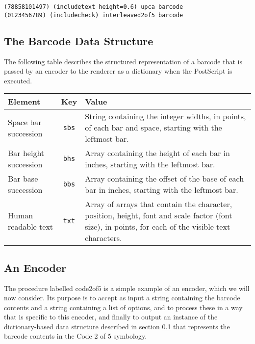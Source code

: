\documentclass[11pt,english,BCOR10mm,DIV12,bibliography=totoc,parskip=false,smallheadings
    headexclude,footexclude,oneside]{pst-doc}
\begin{document}
\begin{lstlisting}
(78858101497) (includetext height=0.6) upca barcode
(0123456789) (includecheck) interleaved2of5 barcode
\end{lstlisting}


\subsection{The Barcode Data Structure}
\label{datastructure}
The following table describes the structured representation of a
barcode that is passed by an encoder to the renderer as a
dictionary when the PostScript is executed.

\begin{center}

\begin{tabular}{l|c|p{6.5cm}}
Element               & Key  & Value \\
\hline
Space bar succession  & \texttt{sbs}  & 
String containing the integer widths, in points, of each bar and 
space, starting with the leftmost bar.\\ 

Bar height succession & \texttt{bhs}  &
Array containing the height of each bar in inches, starting with 
the leftmost bar.\\

Bar base succession   & \texttt{bbs}  &  
Array containing the offset of the base of each bar in inches,
starting with the leftmost bar.\\

Human readable text   & \texttt{txt}  &
Array of arrays that contain the character, position, height,
font and scale factor (font size), in points, for each of the visible 
text characters.
\end{tabular}

\end{center}


\subsection{An Encoder}

The procedure labelled code2of5 is a simple example of an encoder,
which we will now consider. Its purpose is to accept as input a string
containing the barcode contents and a string containing a list of options, 
and to process these in a way
that is specific to this encoder, and finally to output an
instance of the dictionary-based data structure described in section
\ref{datastructure} that represents the barcode contents in the 
Code 2 of 5 symbology.
\end{document}
